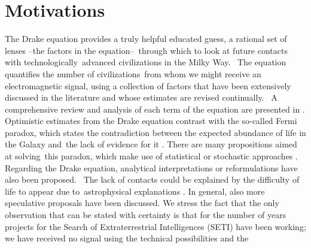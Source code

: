 \documentclass[crop]{CSLB}
\begin{document}
\maketitle


\section{Motivations}\label{S_motivations}

The Drake equation  \citep{drake_intelligent_1962} provides a truly
helpful educated guess, a rational set of lenses --the factors in the
equation-- through which to look at future contacts with
technologically advanced civilizations in the Milky Way. 
%
The equation quantifies the number of civilizations from whom we might
receive an electromagnetic signal, using a collection of factors that
have been extensively discussed in the literature and whose estimates
are revised continually. 
%
A comprehensive review and analysis of each term of the equation are
presented in \citet{vakoch_drake_2015}.
%
Optimistic estimates from the Drake equation contrast with the
so-called Fermi paradox, which states the contradiction between the
expected abundance of life in the Galaxy and the lack of evidence for
it \citep[e.g. ][]{hart_explanation_1975, brin_great_1983,
barlow_galactic_2012, forgan_galactic_2016, vanhouten_isthere_2017,
Sotos_biotechnology_2019, carroll_nellemback_fermi_2019}.
%
There are many propositions aimed at solving this paradox, which make
use of statistical \citep{solomonides_probabilistic_2016,
vanhouten_isthere_2017, horvat_calculating_2007,
maccone_statistical_2015} or stochastic approaches
\citep{forgan_numerical_2009, bloetscher_using_2019,
glade_stochastic_2011, forgan_numerical_2010}.
%
Regarding the Drake equation, analytical interpretations
\citep{prantzos_joint_2013, smith_broadcasting_2009} or reformulations
\citep[][and references therein]{burchell_whither_2006} have also been
proposed. 
%
The lack of contacts could be explained by the difficulty of life to
appear due to astrophysical explanations
\citep{annis_astrophysical_1999}.
%
In general, also more speculative proposals
\citep{barlow_galactic_2013, lampton_information_2013,
conway_three_2018, forgan_galactic_2017} have been discussed.
% 
% 
% 
% 
\Fpagebreak
%
We stress the fact that the only observation that can be stated with
certainty is that for the number of years projects for the Search of
Extraterrestrial Intelligences (SETI) have been working; we have
received no signal using the technical possibilities and the
\end{document}
